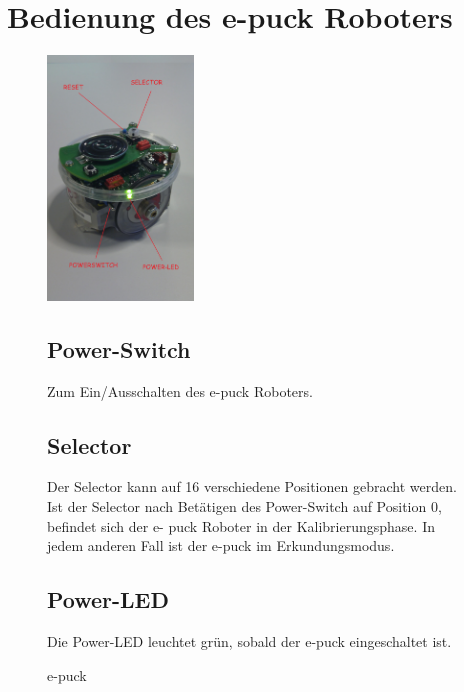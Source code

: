 \documentclass[10pt,a4paper]{article}
\let\oldsection\section
\renewcommand{\section}{\newpage \oldsection}
\begin{document}
\section{Bedienung des e-puck Roboters}
	\label{e_puck_bedienung}

 	\begin{figure}[htbp]
		\begin{minipage}[t]{6.5cm}
			\vspace{0pt}
			\includegraphics[height=6.5cm]{images/puck1klein} 
			\caption{e-puck}
		\end{minipage}
		\hfill
		\begin{minipage}[t]{0.5\textwidth}
			\vspace{5pt}
				\subsection{Power-Switch}
					Zum Ein/Ausschalten des e-puck Roboters.
				\subsection{Selector}
					Der Selector kann auf 16 verschiedene Positionen gebracht werden. Ist der Selector nach Bet\"atigen des Power-Switch auf Position 0, befindet sich der e-
					puck Roboter in der Kalibrierungsphase. In jedem anderen Fall ist der e-puck im Erkundungsmodus.
				\subsection{Power-LED}
					Die Power-LED leuchtet gr\"un, sobald der e-puck eingeschaltet ist.
		\end{minipage}
   \end{figure}
   
\end{document}
